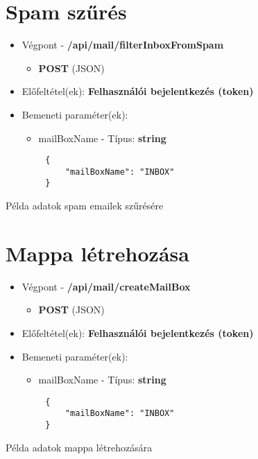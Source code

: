 \section{Spam szűrés}
\begin{itemize}
    \item Végpont - \textbf{/api/mail/filterInboxFromSpam}
    \begin{itemize}
        \item \textbf{POST} (JSON)
    \end{itemize}
    \item Előfeltétel(ek): \textbf{Felhasználói bejelentkezés (token)}
\end{itemize}
\begin{itemize}
    \item Bemeneti paraméter(ek):
    \begin{itemize}
        \item mailBoxName - Típus: \textbf{string}
    \end{itemize}
\end{itemize}
\begin{listing}[H]
    \begin{verbatim}
        {
            "mailBoxName": "INBOX"
        }
    \end{verbatim}
    \caption{Példa adatok spam emailek szűrésére}
    \label{code:json_spam_email_mailbox}
\end{listing}

\section{Mappa létrehozása}
\begin{itemize}
    \item Végpont - \textbf{/api/mail/createMailBox}
    \begin{itemize}
        \item \textbf{POST} (JSON)
    \end{itemize}
    \item Előfeltétel(ek): \textbf{Felhasználói bejelentkezés (token)}
\end{itemize}
\begin{itemize}
    \item Bemeneti paraméter(ek):
    \begin{itemize}
        \item mailBoxName - Típus: \textbf{string}
    \end{itemize}
\end{itemize}
\begin{listing}[H]
    \begin{verbatim}
        {
            "mailBoxName": "INBOX"
        }
    \end{verbatim}
    \caption{Példa adatok mappa létrehozására}
    \label{code:json_new_email_mailbox}
\end{listing}

